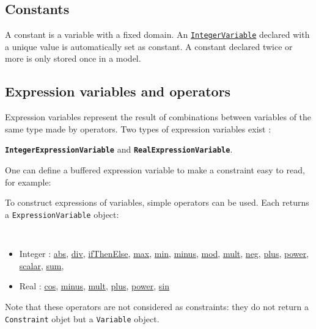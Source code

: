 \subsection{Constants}\label{model:constants}\hypertarget{model:constants}{}
A constant is a variable with a fixed domain. An \hyperlink{integervariable}{\tt IntegerVariable} declared with a unique value is automatically set as constant. A constant declared twice or more is only stored once in a model.



\subsection{Expression variables and operators}\label{model:expressionvariables}\hypertarget{model:expressionvariables}{}
Expression variables represent the result of combinations between variables of the same type made by operators. Two types of expression variables exist : 
\begin{notedef}
\textbf{\tt IntegerExpressionVariable} and \textbf{\tt RealExpressionVariable}.
\end{notedef}
One can define a buffered expression variable to make a constraint easy to read, for example:



To construct expressions of variables, simple operators can be used. Each returns a \texttt{ExpressionVariable} object:
\begin{notedef}\tt
\begin{itemize}
\item Integer : \hyperlink{abs:absoperator}{abs}, \hyperlink{div:divoperator}{div}, \hyperlink{ifthenelse:ifthenelseoperator}{ifThenElse}, \hyperlink{max:maxoperator}{max}, \hyperlink{min:minoperator}{min}, \hyperlink{minus:minusoperator}{minus}, \hyperlink{mod:modoperator}{mod}, \hyperlink{mult:multoperator}{mult}, \hyperlink{neg:negoperator}{neg}, \hyperlink{plus:plusoperator}{plus}, \hyperlink{power:poweroperator}{power}, \hyperlink{scalar:scalaroperator}{scalar}, \hyperlink{sum:sumoperator}{sum},
\item Real : \hyperlink{cos:cosoperator}{cos}, \hyperlink{minus:minusoperator}{minus}, \hyperlink{mult:multoperator}{mult}, \hyperlink{plus:plusoperator}{plus}, \hyperlink{power:poweroperator}{power}, \hyperlink{sin:sinoperator}{sin}
\end{itemize}
\end{notedef}
Note that these operators are not considered as constraints: they do not return a \texttt{Constraint} objet but a \texttt{Variable} object.


